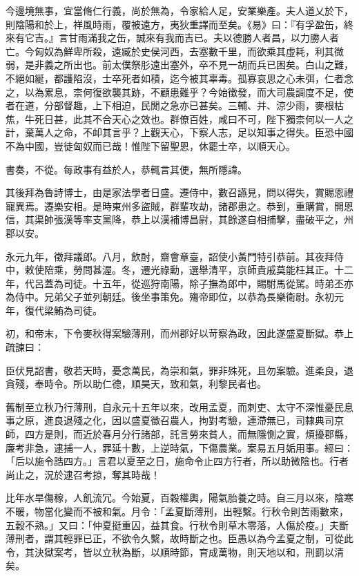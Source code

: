 \begin{pinyinscope}
今邊境無事，宜當脩仁行義，尚於無為，令家給人足，安業樂產。夫人道乂於下，則陰陽和於上，祥風時雨，覆被遠方，夷狄重譯而至矣。《易》曰：『有孚盈缶，終來有它吉。』言甘雨滿我之缶，誠來有我而吉已。夫以德勝人者昌，以力勝人者亡。今匈奴為鮮卑所殺，遠臧於史侯河西，去塞數千里，而欲乘其虛耗，利其微弱，是非義之所出也。前太僕祭肜遠出塞外，卒不見一胡而兵已困矣。白山之難，不絕如綖，都護陷沒，士卒死者如積，迄今被其辜毒。孤寡哀思之心未弭，仁者念之，以為累息，柰何復欲襲其跡，不顧患難乎？今始徵發，而大司農調度不足，使者在道，分部督趣，上下相迫，民閒之急亦已甚矣。三輔、并、涼少雨，麥根枯焦，牛死日甚，此其不合天心之效也。群僚百姓，咸曰不可，陛下獨柰何以一人之計，棄萬人之命，不卹其言乎？上觀天心，下察人志，足以知事之得失。臣恐中國不為中國，豈徒匈奴而已哉！惟陛下留聖恩，休罷士卒，以順天心。

書奏，不從。每政事有益於人，恭輒言其便，無所隱諱。

其後拜為魯詩博士，由是家法學者日盛。遷侍中，數召讌見，問以得失，賞賜恩禮寵異焉。遷樂安相。是時東州多盜賊，群輩攻劫，諸郡患之。恭到，重購賞，開恩信，其渠帥張漢等率支黨降，恭上以漢補博昌尉，其餘遂自相捕擊，盡破平之，州郡以安。

永元九年，徵拜議郎。八月，飲酎，齋會章臺，詔使小黃門特引恭前。其夜拜侍中，敕使陪乘，勞問甚渥。冬，遷光祿勳，選舉清平，京師貴戚莫能枉其正。十二年，代呂蓋為司徒。十五年，從巡狩南陽，除子撫為郎中，賜駙馬從駕。時弟丕亦為侍中。兄弟父子並列朝廷。後坐事策免。殤帝即位，以恭為長樂衛尉。永初元年，復代梁鮪為司徒。

初，和帝末，下令麥秋得案驗薄刑，而州郡好以苛察為政，因此遂盛夏斷獄。恭上疏諫曰：

臣伏見詔書，敬若天時，憂念萬民，為崇和氣，罪非殊死，且勿案驗。進柔良，退貪殘，奉時令。所以助仁德，順昊天，致和氣，利黎民者也。

舊制至立秋乃行薄刑，自永元十五年以來，改用孟夏，而刺吏、太守不深惟憂民息事之原，進良退殘之化，因以盛夏徵召農人，拘對考驗，連滯無已，司隸典司京師，四方是則，而近於春月分行諸部，託言勞來貧人，而無隱惻之實，煩擾郡縣，廉考非急，逮捕一人，罪延十數，上逆時氣，下傷農業。案易五月姤用事。經曰：「后以施令誥四方。」言君以夏至之日，施命令止四方行者，所以助微陰也。行者尚止之，況於逮召考掠，奪其時哉！

比年水旱傷稼，人飢流冗。今始夏，百穀權輿，陽氣胎養之時。自三月以來，陰寒不暖，物當化變而不被和氣。月令：「孟夏斷薄刑，出輕繫。行秋令則苦雨數來，五穀不熟。」又曰：「仲夏挺重囚，益其食。行秋令則草木零落，人傷於疫。」夫斷薄刑者，謂其輕罪已正，不欲令久繫，故時斷之也。臣愚以為今孟夏之制，可從此令，其決獄案考，皆以立秋為斷，以順時節，育成萬物，則天地以和，刑罰以清矣。


\end{pinyinscope}
